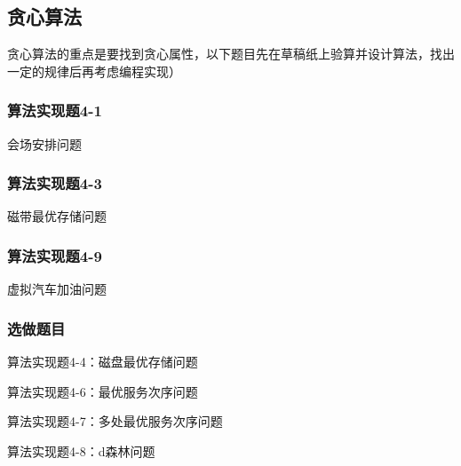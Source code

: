 \documentclass[UTF8]{ctexart}
\begin{document}
\subsection{贪心算法}
贪心算法的重点是要找到贪心属性，以下题目先在草稿纸上验算并设计算法，找出一定的规律后再考虑编程实现）
\subsubsection*{算法实现题4-1}
会场安排问题
\subsubsection*{算法实现题4-3}
磁带最优存储问题
\subsubsection*{算法实现题4-9}
虚拟汽车加油问题
\subsubsection*{选做题目}
算法实现题4-4：磁盘最优存储问题

算法实现题4-6：最优服务次序问题

算法实现题4-7：多处最优服务次序问题

算法实现题4-8：d森林问题
\end{document}
